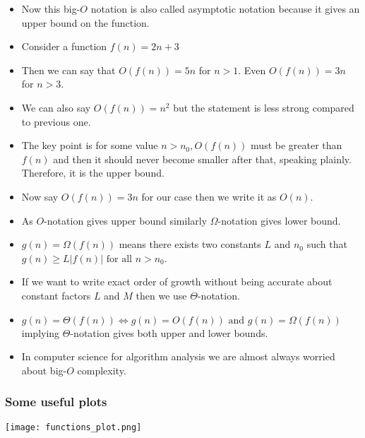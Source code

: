 \documentclass[aspectratio=1610]{beamer}
\begin{document}
\begin{frame}
\begin{itemize}
\item Now this big-$O$ notation is also called asymptotic notation because
it gives an upper bound on the function.
\item Consider a function $f(n) = 2n + 3$
\item Then we can say that $O(f(n)) = 5n$ for $n>1$. Even $O(f(n))=3n$ for
$n>3$.
\item We can also say $O(f(n)) = n^2$ but the statement is less strong
compared to previous one.
\item The key point is for some value $n>n_0, O(f(n))$ must be greater than
$f(n)$ and then it should never become smaller after that, speaking plainly.
Therefore, it is the upper bound.
\item Now say $O(f(n))=3n$ for our case then we write it as $O(n)$.
\item As $O$-notation gives upper bound similarly $\Omega$-notation gives
lower bound.
\item $g(n)=\Omega (f(n))$ means there exists two constants $L$ and $n_0$ such
that $g(n)\ge L|f(n)| \text{ for all } n>n_0$.
\item If we want to write exact order of growth without being accurate
about constant factors $L$ and $M$ then we use $\Theta$-notation.
\item $g(n)=\Theta (f(n)) \Leftrightarrow g(n)=O(f(n)) \text { and } g(n)=\Omega(f(n))$
implying $\Theta$-notation gives both upper and lower bounds.
\item In computer science for algorithm analysis we are almost always worried
about big-$O$ complexity.
\end{itemize}
\end{frame}

\begin{frame}
\frametitle{Some useful plots}
\begin{center}
\texttt{[image: functions\_plot.png]}
\end{center}
\end{frame}
\end{document}
